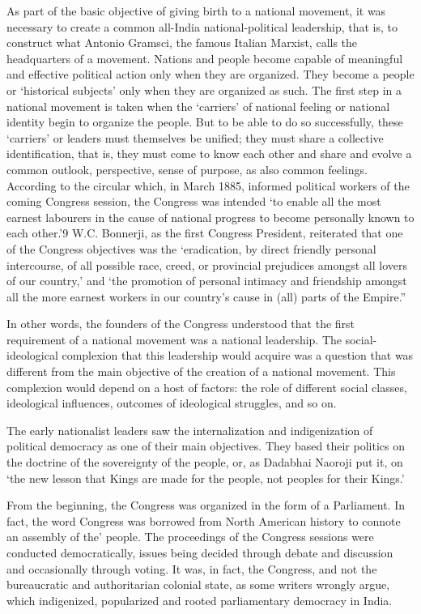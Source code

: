 As part of the basic objective of giving birth to a national movement, it was necessary to create a common all-India national-political leadership, that is, to construct what Antonio Gramsci, the famous Italian Marxist, calls the headquarters of a movement. Nations and people become capable of meaningful and effective political action only when they are organized. They become a people or ‘historical subjects’ only when they are organized as such. The first step in a national movement is taken when the ‘carriers’ of national feeling or national identity begin to organize the people. But to be able to do so successfully, these ‘carriers’ or leaders must themselves be unified; they must share a collective identification, that is, they must come to know each other and share and evolve a common outlook, perspective, sense of purpose, as also common feelings. According to the circular which, in March 1885, informed political workers of the coming Congress session, the Congress was intended ‘to enable all the most earnest labourers in the cause of national progress to become personally known to each other.’9 W.C. Bonnerji, as the first Congress President, reiterated that one of the Congress objectives was the ‘eradication, by direct friendly personal intercourse, of all possible race, creed, or provincial prejudices amongst all lovers of our country,’ and ‘the promotion of personal intimacy and friendship amongst all the more earnest workers in our country’s cause in (all) parts of the Empire.”

In other words, the founders of the Congress understood that the first requirement of a national movement was a national leadership. The social- ideological complexion that this leadership would acquire was a question that was different from the main objective of the creation of a national movement. This complexion would depend on a host of factors: the role of different social classes, ideological influences, outcomes of ideological struggles, and so on.

The early nationalist leaders saw the internalization and indigenization of political democracy as one of their main objectives. They based their politics on the doctrine of the sovereignty of the people, or, as Dadabhai Naoroji put it, on ‘the new lesson that Kings are made for the people, not peoples for their Kings.’

From the beginning, the Congress was organized in the form of a Parliament. In fact, the word Congress was borrowed from North American history to connote an assembly of the’ people. The proceedings of the Congress sessions were conducted democratically, issues being decided through debate and discussion and occasionally through voting. It was, in fact, the Congress, and not the bureaucratic and authoritarian colonial state, as some writers wrongly argue, which indigenized, popularized and rooted parliamentary democracy in India.

